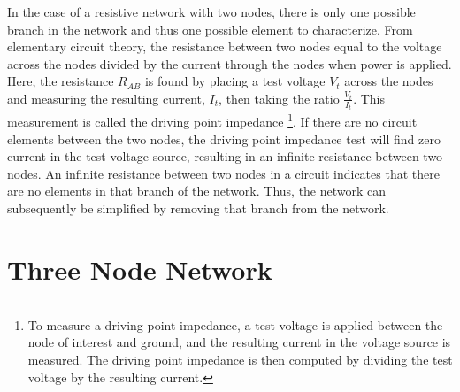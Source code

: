 \documentclass[12pt,twoside,vi]{mitthesis}
\begin{document}
In the case of a resistive network with two nodes, there is only one possible branch in the network and thus one possible element to characterize.
From elementary circuit theory, the resistance between two nodes equal to the voltage across the nodes divided by the current through the nodes when power is applied.  
Here, the resistance $R_{AB}$ is found by placing a test voltage $V_t$ across the nodes and measuring the resulting current, $I_t$, then taking the ratio $\frac{V_t}{I_t}$.
This measurement is called the driving point impedance \footnote{To measure a driving point impedance, a test voltage is applied between the node of interest and ground, and the resulting current in the voltage source is measured. 
The driving point impedance is then computed by dividing the test voltage by the resulting current.}.
If there are no circuit elements between the two nodes, the driving point impedance test will find zero current in the test voltage source, resulting in an infinite resistance between two nodes.
An infinite resistance between two nodes in a circuit indicates that there are no elements in that branch of the network.
Thus, the network can subsequently be simplified by removing that branch from the network.


\section{Three Node Network}
\end{document}
